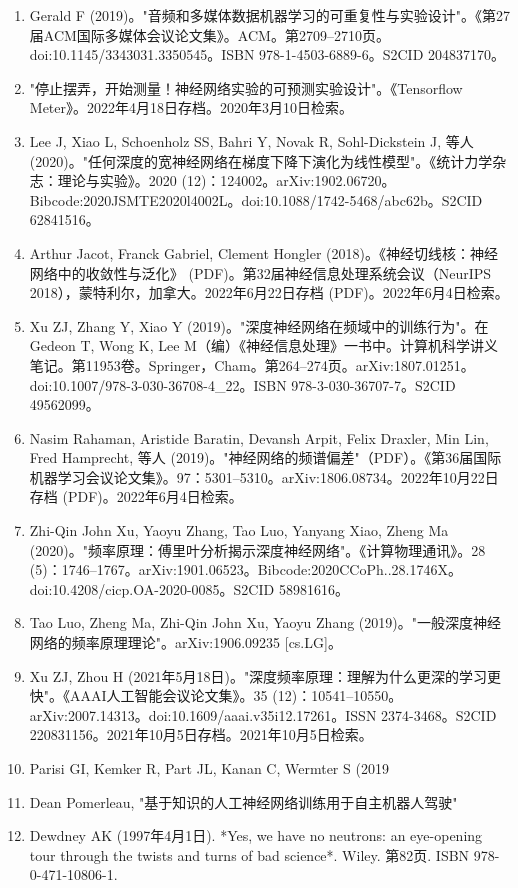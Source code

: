 \begin{enumerate}
\item Gerald F (2019)。"音频和多媒体数据机器学习的可重复性与实验设计"。《第27届ACM国际多媒体会议论文集》。ACM。第2709–2710页。doi:10.1145/3343031.3350545。ISBN 978-1-4503-6889-6。S2CID 204837170。
\item "停止摆弄，开始测量！神经网络实验的可预测实验设计"。《Tensorflow Meter》。2022年4月18日存档。2020年3月10日检索。
\item Lee J, Xiao L, Schoenholz SS, Bahri Y, Novak R, Sohl-Dickstein J, 等人 (2020)。"任何深度的宽神经网络在梯度下降下演化为线性模型"。《统计力学杂志：理论与实验》。2020 (12)：124002。arXiv:1902.06720。Bibcode:2020JSMTE2020l4002L。doi:10.1088/1742-5468/abc62b。S2CID 62841516。
\item Arthur Jacot, Franck Gabriel, Clement Hongler (2018)。《神经切线核：神经网络中的收敛性与泛化》 (PDF)。第32届神经信息处理系统会议（NeurIPS 2018），蒙特利尔，加拿大。2022年6月22日存档 (PDF)。2022年6月4日检索。
\item Xu ZJ, Zhang Y, Xiao Y (2019)。"深度神经网络在频域中的训练行为"。在Gedeon T, Wong K, Lee M（编）《神经信息处理》一书中。计算机科学讲义笔记。第11953卷。Springer，Cham。第264–274页。arXiv:1807.01251。doi:10.1007/978-3-030-36708-4_22。ISBN 978-3-030-36707-7。S2CID 49562099。
\item Nasim Rahaman, Aristide Baratin, Devansh Arpit, Felix Draxler, Min Lin, Fred Hamprecht, 等人 (2019)。"神经网络的频谱偏差"（PDF）。《第36届国际机器学习会议论文集》。97：5301–5310。arXiv:1806.08734。2022年10月22日存档 (PDF)。2022年6月4日检索。
\item Zhi-Qin John Xu, Yaoyu Zhang, Tao Luo, Yanyang Xiao, Zheng Ma (2020)。"频率原理：傅里叶分析揭示深度神经网络"。《计算物理通讯》。28 (5)：1746–1767。arXiv:1901.06523。Bibcode:2020CCoPh..28.1746X。doi:10.4208/cicp.OA-2020-0085。S2CID 58981616。
\item Tao Luo, Zheng Ma, Zhi-Qin John Xu, Yaoyu Zhang (2019)。"一般深度神经网络的频率原理理论"。arXiv:1906.09235 [cs.LG]。
\item Xu ZJ, Zhou H (2021年5月18日)。"深度频率原理：理解为什么更深的学习更快"。《AAAI人工智能会议论文集》。35 (12)：10541–10550。arXiv:2007.14313。doi:10.1609/aaai.v35i12.17261。ISSN 2374-3468。S2CID 220831156。2021年10月5日存档。2021年10月5日检索。
\item Parisi GI, Kemker R, Part JL, Kanan C, Wermter S (2019
\item Dean Pomerleau, "基于知识的人工神经网络训练用于自主机器人驾驶"  
\item Dewdney AK (1997年4月1日). *Yes, we have no neutrons: an eye-opening tour through the twists and turns of bad science*. Wiley. 第82页. ISBN 978-0-471-10806-1.  

\end{enumerate}
